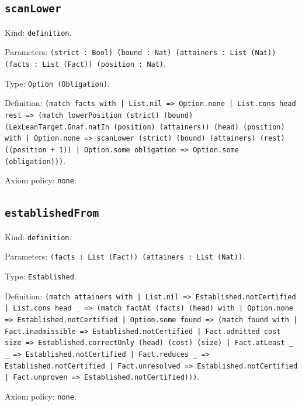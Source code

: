 \documentclass[11pt]{article}
\begin{document}
\subsection*{\texttt{scanLower}}
\noindent Kind: \texttt{definition}.\par
\noindent Parameters: \texttt{(strict : Bool) (bound : Nat) (attainers : List (Nat)) (facts : List (Fact)) (position : Nat)}.\par
\noindent Type: \texttt{Option (Obligation)}.\par
\noindent Definition: \texttt{(match facts with | List.nil => Option.none | List.cons head rest => (match lowerPosition (strict) (bound) (LexLeanTarget.Gnaf.natIn (position) (attainers)) (head) (position) with | Option.none => scanLower (strict) (bound) (attainers) (rest) ((position + 1)) | Option.some obligation => Option.some (obligation)))}.\par
\noindent Axiom policy: \texttt{none}.\par
\subsection*{\texttt{establishedFrom}}
\noindent Kind: \texttt{definition}.\par
\noindent Parameters: \texttt{(facts : List (Fact)) (attainers : List (Nat))}.\par
\noindent Type: \texttt{Established}.\par
\noindent Definition: \texttt{(match attainers with | List.nil => Established.notCertified | List.cons head \_ => (match factAt (facts) (head) with | Option.none => Established.notCertified | Option.some found => (match found with | Fact.inadmissible => Established.notCertified | Fact.admitted cost size => Established.correctOnly (head) (cost) (size) | Fact.atLeast \_ \_ => Established.notCertified | Fact.reduces \_ => Established.notCertified | Fact.unresolved => Established.notCertified | Fact.unproven => Established.notCertified)))}.\par
\noindent Axiom policy: \texttt{none}.\par
\end{document}
